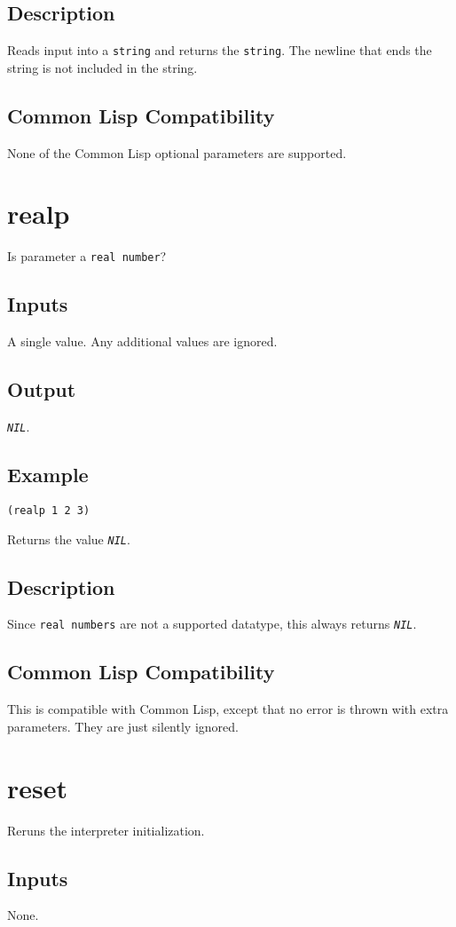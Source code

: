 \documentclass[10pt, openany]{book}
\newcommand{\constant}[1]{\emph{\texttt{#1}}}
\newcommand{\datatype}[1]{\texttt{#1}}
\newcommand{\cl}{Common Lisp}
\begin{document}
\subsection{Description}
Reads input into a \datatype{string} and returns the \datatype{string}.  The newline that ends the string is not included in the string.
\subsection{Common Lisp Compatibility}
None of the \cl{} optional parameters are supported.

\section{realp}
Is parameter a \datatype{real number}?
\subsection{Inputs}
A single value.  Any additional values are ignored.
\subsection{Output}
\constant{NIL}.
\subsection{Example}
\begin{lstlisting}
(realp 1 2 3)
\end{lstlisting}
Returns the value \constant{NIL}.
\subsection{Description}
Since \datatype{real numbers} are not a supported datatype, this always returns \constant{NIL}.
\subsection{Common Lisp Compatibility}
This is compatible with \cl, except that no error is thrown with extra parameters.  They are just silently ignored.

\section{reset}
Reruns the interpreter initialization.
\subsection{Inputs}
None.
\end{document}
